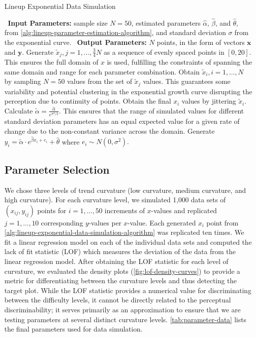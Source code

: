 \documentclass[12pt]{article}
\begin{document}
\begin{algorithm}
  \caption{Lineup Exponential Data Simulation}\label{alg:lineup-exponential-data-simulation-algorithm}
  \begin{algorithmic}[1]
    \Statex \hspace*{-1em}\textbullet~\textbf{Input Parameters:} sample size $N = 50$, estimated parameters $\hat\alpha$, $\hat\beta$, and $\hat\theta$, from \cref{alg:lineup-parameter-estimation-algorithm}, and standard deviation $\sigma$ from the exponential curve.
    \Statex \hspace*{-1em}\textbullet~\textbf{Output Parameters:} $N$ points, in the form of vectors $\mathbf{x}$ and $\mathbf{y}$.
    \State Generate $\tilde x_j, j = 1,..., \frac{3}{4}N$ as a sequence of evenly spaced points in $[0,20]$. This ensures the full domain of $x$ is used, fulfilling the constraints of spanning the same domain and range for each parameter combination.
    \State Obtain $\tilde x_i, i = 1,...,N$ by sampling $N = 50$ values from the set of $\tilde x_j$ values. This guarantees some variability and potential clustering in the exponential growth curve disrupting the perception due to continuity of points.
    \State Obtain the final $x_i$ values by jittering $\tilde x_i$.
    \State Calculate $\tilde\alpha = \frac{\hat\alpha}{e^{\sigma^2/2}}.$ This ensures that the range of simulated values for different standard deviation parameters has an equal expected value for a given rate of change due to the non-constant variance across the domain.
    \State Generate $y_i = \tilde\alpha\cdot e^{\hat\beta x_i + e_i}+\hat\theta$ where $e_i\sim N(0,\sigma^2).$
  \end{algorithmic}
\end{algorithm}

\hypertarget{lineups-parameter-selection}{%
\subsection{Parameter Selection}\label{lineups-parameter-selection}}

We chose three levels of trend curvature (low curvature, medium
curvature, and high curvature). For each curvature level, we simulated
1,000 data sets of \((x_{ij}, y_{ij})\) points for \(i = 1,...,50\)
increments of \(x\)-values and replicated \(j = 1,...,10\) corresponding
\(y\)-values per \(x\)-value. Each generated \(x_i\) point from
\cref{alg:lineup-exponential-data-simulation-algorithm} was replicated
ten times. We fit a linear regression model on each of the individual
data sets and computed the lack of fit statistic (LOF) which measures
the deviation of the data from the linear regression model. After
obtaining the LOF statistic for each level of curvature, we evaluated
the density plots (\cref{fig:lof-density-curves}) to provide a metric
for differentiating between the curvature levels and thus detecting the
target plot. While the LOF statistic provides a numerical value for
discriminating between the difficulty levels, it cannot be directly
related to the perceptual discriminability; it serves primarily as an
approximation to ensure that we are testing parameters at several
distinct curvature levels. \cref{tab:parameter-data} lists the final
parameters used for data simulation.
\end{document}
